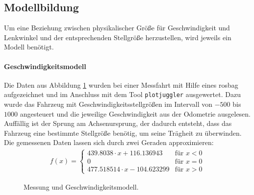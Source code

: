 \subsection{Modellbildung}
\label{subsec:02modellbildung}
Um eine Beziehung zwischen physikalischer Gr\"o\ss{}e f\"ur Geschwindigkeit und Lenkwinkel und der entsprechenden Stellgr\"o\ss{}e herzustellen, wird jeweils ein Modell ben\"otigt.
\paragraph{Geschwindigkeitsmodell} 
Die Daten aus Abbildung \ref{fig:Geschwindigkeitsmodell} wurden bei einer Messfahrt mit Hilfe eines rosbag aufgezeichnet und im Anschluss mit dem Tool \texttt{plotjuggler} ausgewertet. Dazu wurde das Fahrzeug mit Geschwindigkeitsstellgr\"o\ss{}en im Intervall von $-500$ bis $1000$ angesteuert und die jeweilige Geschwindigkeit aus der Odometrie ausgelesen. Auff\"allig ist der Sprung am Achsenursprung, der dadurch entsteht, dass das Fahrzeug eine bestimmte Stellgr\"o\ss{}e ben\"otig, um seine Tr\"agheit zu \"uberwinden.
Die gemessenen Daten lassen sich durch zwei Geraden approximieren:
\begin{align*}
  f(x) =
  \begin{cases}
  439.8038\cdot x+116.136943 & \text{f\"ur } x < 0 \\
  0 & \text{f\"ur } x=0\\
  477.518514\cdot x-104.623299 & \text{f\"ur } x > 0 
  \end{cases}
\end{align*}

\begin{figure}[h]
	\centering
	\caption{Messung und Geschwindigkeitsmodell.}
	\label{fig:Geschwindigkeitsmodell}
\end{figure}

